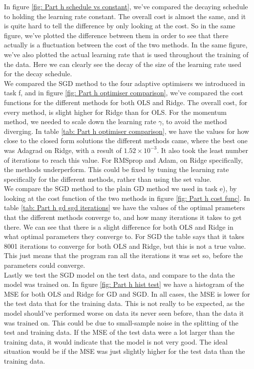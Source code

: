 \documentclass[reprint,english,notitlepage]{revtex4-2}  %
\begin{document}
In figure \ref{fig: Part h schedule vs constant}, we've compared the decaying schedule to holding the learning rate constant. The overall cost is almost the same, and it is quite hard to tell the difference by only looking at the cost. So in the same figure, we've plotted the difference between them in order to see that there actually is a fluctuation between the cost of the two methods. In the same figure, we've also plotted the actual learning rate that is used throughout the training of the data. Here we can clearly see the decay of the size of the learning rate used for the decay schedule. \\
We compared the SGD method to the four adaptive optimisers we introduced in task f, and in figure \ref{fig: Part h optimiser comparison}, we've compared the cost functions for the different methods for both OLS and Ridge. The overall cost, for every method, is slight higher for Ridge than for OLS. For the momentum method, we needed to scale down the learning rate $\gamma$, to avoid the method diverging. In table \ref{tab: Part h optimiser comparison}, we have the values for how close to the closed form solutions the different methods came, where the best one was Adagrad on Ridge, with a result of $1.52 \times 10^{-3}$. It also took the least number of iterations to reach this value. For RMSprop and Adam, on Ridge specifically, the methods underperform. This could be fixed by tuning the learning rate specifically for the different methods, rather than using the set value. \\
We compare the SGD method to the plain GD method we used in task e), by looking at the cost function of the two methods in figure \ref{fig: Part h cost func}. In table \ref{tab: Part h gd sgd iterations} we have the values of the optimal prameters that the different methods converge to, and how many iterations it takes to get there. We can see that there is a slight difference for both OLS and Ridge in what optimal parameters they converge to. For SGD the table says that it takes 8001 iterations to converge for both OLS and Ridge, but this is not a true value. This just means that the program ran all the iterations it was set so, before the parameters could converge. \\
Lastly we test the SGD model on the test data, and compare to the data the model was trained on. In figure \ref{fig: Part h hist test} we have a histogram of the MSE for both OLS and Ridge for GD and SGD. In all cases, the MSE is lower for the test data that for the training data. This is not really to be expected, as the model should've performed worse on data its never seen before, than the data it was trained on. This could be due to small-sample noise in the splitting of the test and training data. If the MSE of the test data were a lot larger than the training data, it would indicate that the model is not very good. The ideal situation would be if the MSE was just slightly higher for the test data than the training data. 
\end{document}
